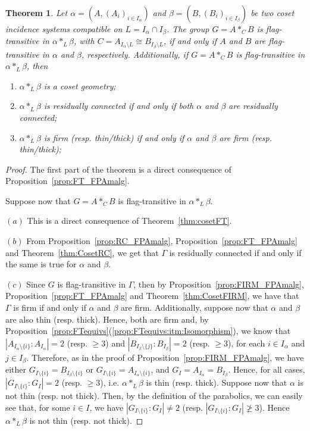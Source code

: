 \documentclass[11pt,letterpaper]{amsart}
\newtheorem{thm}[prop]{Theorem}
\begin{document}
\begin{thm}\label{thm:Amalg_a)FT_b)Geo_c)_RC_b)_FIRM}
    Let $\alpha=(A,(A_i)_{i\in I_\alpha})$ and $\beta=(B,(B_i)_{i\in I_\beta})$ be two coset incidence systems compatible on $L=I_\alpha\cap I_\beta$.     
    The group $G = A *_C B$ is flag-transitive in $\alpha*_L\beta$, with $C=A_{I_\alpha \setminus L}\cong B_{I_\beta\setminus L}$, if and only if $A$ and $B$ are flag-transitive in $\alpha$ and $\beta$, respectively. Additionally, if $G = A *_C B$ is flag-transitive in $\alpha*_L\beta$, then
\begin{enumerate}
    \item $\alpha*_L\beta$ is a coset geometry;
    \item $\alpha*_L\beta$ is residually connected if and only if both $\alpha$ and $\beta$ are residually connected;
    \item $\alpha*_L\beta$ is firm (resp. thin/thick) if and only if $\alpha$ and $\beta$ are firm (resp. thin/thick);
\end{enumerate}
\end{thm}

\begin{proof}
    The first part of the theorem is a direct consequence of Proposition~\ref{prop:FT_FPAmalg}.
    
    Suppose now that $G = A *_C B$ is flag-transitive in $\alpha*_L\beta$.
    
    $(a)$ This is a direct consequence of Theorem~\ref{thm:cosetFT}.

    $(b)$ From Proposition~\ref{prop:RC_FPAmalg}, Proposition~\ref{prop:FT_FPAmalg} and Theorem~\ref{thm:CosetRC}, we get that $\Gamma$ is residually connected if and only if the same is true for $\alpha$ and $\beta$. 

    $(c)$ Since $G$ is flag-transitive in $\Gamma$, then by Proposition~\ref{prop:FIRM_FPAmalg}, Proposition~\ref{prop:FT_FPAmalg} and Theorem~\ref{thm:CosetFIRM}, we have that $\Gamma$ is firm if and only if $\alpha$ and $\beta$ are firm.
    Additionally, suppose now that $\alpha$ and $\beta$ are also thin (resp. thick). Hence, both are firm and, by Proposition~\ref{prop:FTequivs}(\ref{prop:FTequivs:itm:Isomorphism}), we know that $|A_{I_\alpha\setminus\{i\}}:A_{I_\alpha}|=2$ (resp. $\geq 3$) and $|B_{I_\beta\setminus\{j\}}:B_{I_\beta}|=2$ (resp. $\geq 3$), for each $i\in I_\alpha$ and $j\in I_\beta$.
    Therefore, as in the proof of Proposition~\ref{prop:FIRM_FPAmalg}, we have either $G_{I\setminus\{i\}} =B_{I_\beta\setminus\{i\}}$ or $G_{I\setminus\{i\}} = A_{I_\alpha\setminus\{i\}}$,
    and $G_{I}=A_{I_\alpha}=B_{I_\beta}$.
    Hence, for all cases, $|G_{I\setminus\{i\}}:G_{I}|=2$ (resp. $\geq 3$), i.e. $\alpha *_L \beta$ is thin (resp. thick). 
    Suppose now that $\alpha$ is not thin (resp. not thick). Then, by the definition of the parabolics, we can easily see that, for some $i\in I$, we have $|G_{I\setminus\{i\}}:G_{I}|\neq 2$ (resp. $|G_{I\setminus\{i\}}:G_{I}|\ngeq 3$). Hence $\alpha *_L \beta$ is not thin (resp. not thick).
\end{proof}
\end{document}
